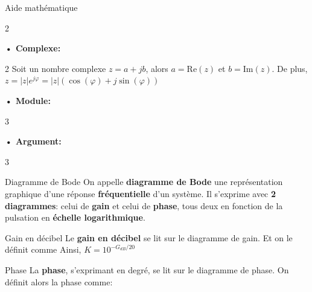 \documentclass{article}
\begin{document}
{\begin{propriété}{Aide mathématique}
\begin{multicols}{2}
\end{multicols}
\textbf{• Complexe:}
\begin{multicols}{2}
Soit un nombre complexe $z=a+jb$, alors $a=\mathrm{Re}(z)$ et $b=\mathrm{Im}(z)$.
De plus, $z=|z|e^{j\varphi}=|z|\left(\cos(\varphi)+j\sin(\varphi)\right)$\columnbreak
{}
\end{multicols}
\textbf{• Module:}
\begin{multicols}{3}
\end{multicols}
\textbf{• Argument:}
\begin{multicols}{3}
\end{multicols}
\end{propriété}
\begin{definition}{Diagramme de Bode}
On appelle \textbf{diagramme de Bode} une représentation graphique d'une réponse \textbf{fréquentielle} d'un système. Il s'exprime avec \textbf{2 diagrammes}: celui de \textbf{gain} et celui de \textbf{phase}, tous deux en fonction de la pulsation en \textbf{échelle logarithmique}.
\end{definition}
\begin{definition}{Gain en décibel}
Le \textbf{gain en décibel} se lit sur le diagramme de gain. Et on le définit comme
Ainsi, $K=10^{-G_{dB}/20}$
\end{definition}
\begin{definition}{Phase}
La \textbf{phase}, s'exprimant en degré, se lit sur le diagramme de phase. On définit alors la phase comme:

\end{definition}}
\end{document}
